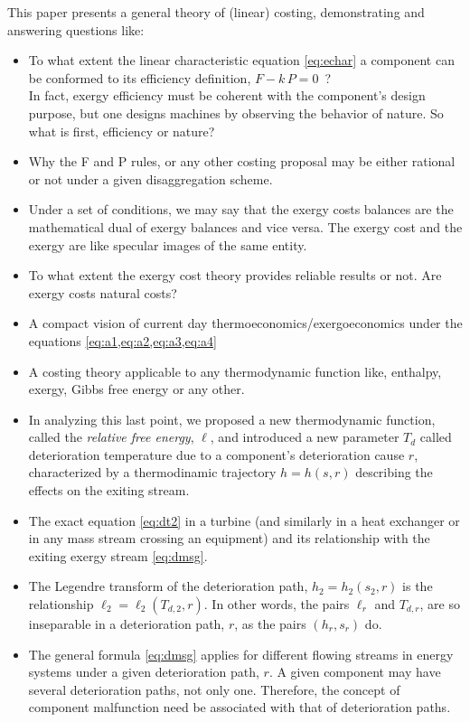 \documentclass[energies,article,submit,moreauthors,pdftex]{Definitions/mdpi}
\begin{document}
This paper presents a general theory of (linear) costing, demonstrating and answering questions like:
\begin{itemize}
	\item To what extent the linear characteristic equation \eqref{eq:echar} a component can be conformed to its efficiency definition, $F - k\, P = 0$~?\\
	In fact, exergy efficiency must be coherent with the component's design purpose, but one designs machines by observing the behavior of nature. So what is first, efficiency or nature?
	\item Why the F and P rules, or any other costing proposal may be either rational or not under a given disaggregation scheme.
	\item Under a set of conditions, we may say that the exergy costs balances are the mathematical dual of exergy balances and vice versa. The exergy cost and the exergy are like specular images of the same entity.
	\item To what extent the exergy cost theory provides reliable results or not. Are exergy costs natural costs?
	\item A compact vision of current day thermoeconomics/exergoeconomics under the equations \cref{eq:a1,eq:a2,eq:a3,eq:a4}
	\item A costing theory applicable to any thermodynamic function like, enthalpy, exergy, Gibbs free energy or any other.
	\item In analyzing this last point, we proposed a new thermodynamic function, called the \emph{relative free energy}, $\ell$, and introduced a new parameter $T_d$ called deterioration temperature due to a component’s deterioration cause $r$, characterized by a thermodinamic trajectory $h=h(s, r)$ describing the effects on the exiting stream. 
	\item The exact equation \eqref{eq:dt2} in a turbine (and similarly in a heat exchanger or in any mass stream crossing an equipment) and its relationship with the exiting exergy stream \cref{eq:dmsg}.
	\item The Legendre transform of the deterioration path, $h_2=h_2 (s_2, r)$ is the relationship  
	$\ell_2 = \ell_2(T_{d,2} , r)$. In other words, the pairs  $\ell_r$ and $T_{d,r}$, are so inseparable in a deterioration path, $r$, as the pairs $(h_r,s_r)$ do.
	\item The general formula \eqref{eq:dmsg} applies for different flowing streams in energy systems under a given deterioration path, $r$. A given component may have several deterioration paths, not only one. Therefore, the concept of component malfunction need be associated with that of deterioration paths.
\end{itemize}
\end{document}
